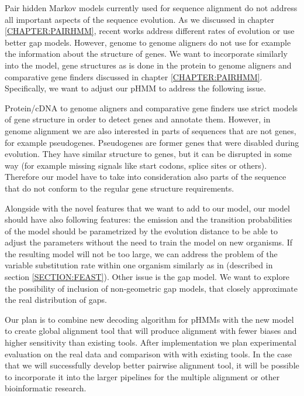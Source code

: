Pair hidden Markov models currently used for sequence alignment do not address
all important aspects of the sequence evolution. As we discussed in chapter
\ref{CHAPTER:PAIRHMM}, recent works address different rates of evolution or use
better gap models. However, genome to genome aligners do not use for example the
information about the structure of genes. We want to incorporate similarly into
the model, gene structures as is done in the protein to genome aligners and
comparative gene finders discussed in chapter \ref{CHAPTER:PAIRHMM}.
Specifically, we want to adjust our pHMM to  address the following issue. 

Protein/cDNA to genome aligners and comparative gene
finders use strict models of  gene structure in order to detect genes and
annotate them.  However, in genome alignment we are also interested in parts of
sequences that are not genes, for example pseudogenes. Pseudogenes are former
genes that were disabled during evolution. They have similar structure to genes,
but it can be disrupted in some way (for example missing signals
like start codons, splice sites or others). Therefore our model have to take
into consideration also parts of the sequence that do not conform to the regular gene
structure requirements.

Alongside with the novel features that we want to add to our model, our model
should have also following features: the emission and the transition
probabilities of the model should be parametrized by the evolution distance to
be able to adjust the parameters without the need to train the model on new
organisms. If the resulting model will not be too large, we can address the
problem of the variable substitution rate within one organism similarly as in
\cite{Hudek2010} (described in section \ref{SECTION:FEAST}). Other issue is the
gap model. We want to explore the possibility of inclusion of non-geometric gap
models, that closely approximate the real distribution of gaps. 

Our plan is to combine new decoding algorithm for pHMMs with the new model to
create global alignment tool that will produce alignment with fewer biases and
higher sensitivity than existing tools. After implementation we plan
experimental evaluation on the real data and comparison with with existing
tools. In the case that we will successfully develop better pairwise alignment
tool, it will be possible to incorporate it into the larger pipelines for the
multiple alignment or other bioinformatic research. 


\label{LastPage}


